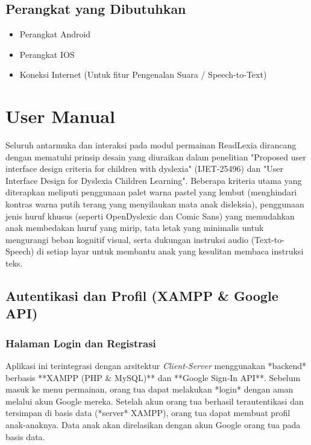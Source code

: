 \documentclass[12pt,a4paper]{report}
\begin{document}
\section{Perangkat yang Dibutuhkan}
\begin{itemize}
\item Perangkat Android
\item Perangkat IOS
\item Koneksi Internet (Untuk fitur Pengenalan Suara / Speech-to-Text)
\end{itemize}


\chapter{User Manual}

Seluruh antarmuka dan interaksi pada modul permainan ReadLexia dirancang dengan mematuhi prinsip desain yang diuraikan dalam penelitian "Proposed user interface design criteria for children with dyslexia" (IJET-25496) dan "User Interface Design for Dyslexia Children Learning". Beberapa kriteria utama yang diterapkan meliputi penggunaan palet warna pastel yang lembut (menghindari kontras warna putih terang yang menyilaukan mata anak disleksia), penggunaan jenis huruf khusus (seperti OpenDyslexic dan Comic Sans) yang memudahkan anak membedakan huruf yang mirip, tata letak yang minimalis untuk mengurangi beban kognitif visual, serta dukungan instruksi audio (Text-to-Speech) di setiap layar untuk membantu anak yang kesulitan membaca instruksi teks.

\section{Autentikasi dan Profil (XAMPP \& Google API)}

\subsection{Halaman Login dan Registrasi}
Aplikasi ini terintegrasi dengan arsitektur \textit{Client-Server} menggunakan *backend* berbasis **XAMPP (PHP \& MySQL)** dan **Google Sign-In API**.
Sebelum masuk ke menu permainan, orang tua dapat melakukan *login* dengan aman melalui akun Google mereka. Setelah akun orang tua berhasil terautentikasi dan tersimpan di basis data (*server* XAMPP), orang tua dapat membuat profil anak-anaknya. Data anak akan direlasikan dengan akun Google orang tua pada basis data.
\end{document}
